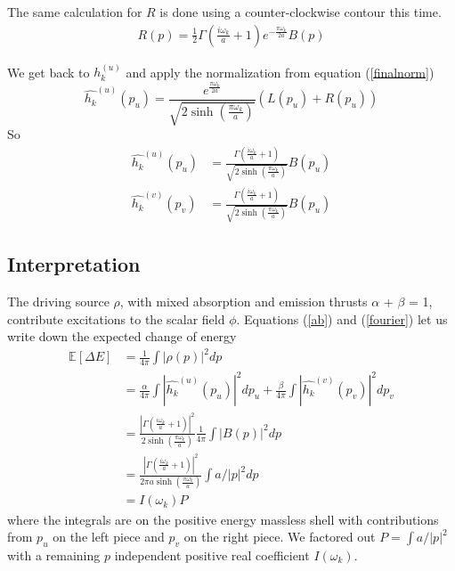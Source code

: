 \documentclass[12pt,a4paper]{article}
\begin{document}
The same calculation for $R$ is done using a counter-clockwise contour this time.
\begin{equation}
\begin{split}
  R(p) = \frac{1}{2}\Gamma\left(\frac{i\omega_k}{a} + 1\right) e^{-\frac{\pi \omega_k}{2a}} B(p)
\end{split}
\end{equation}

We get back to $h_k^{(u)}$ and apply the normalization from equation (\ref{finalnorm})
\begin{equation}
\hat{h_k}^{(u)}(p_u) = \frac{e^{\frac{\pi \omega_k}{2a}}}{\sqrt{2 \sinh \left({\frac{\pi\omega_k}{a}}\right)}}  ( L(p_u) + R(p_u) )
\end{equation}
So
\begin{equation}
\label{fourier}
\begin{split}
\hat{h_k}^{(u)}(p_u) & = \frac{\Gamma\left(\frac{i\omega_k}{a} + 1\right)}{\sqrt{2 \sinh \left({\frac{\pi\omega_k}{a}}\right)}} B(p_u)\\
\hat{h_k}^{(v)}(p_v) &= \frac{\Gamma\left(\frac{i\omega_k}{a} + 1\right)}{\sqrt{2 \sinh \left({\frac{\pi\omega_k}{a}}\right)}} B(p_u)
\end{split}
\end{equation}
\subsection{Interpretation}
The driving source $\rho$, with mixed absorption and emission thrusts $\alpha$ + $\beta$ = 1, contribute excitations to the scalar field $\phi$. Equations (\ref{ab}) and (\ref{fourier}) let us write down the expected change of energy
\begin{equation}  
  \label{number}
  \begin{split}
    \mathbb{E}[\Delta E] &= \frac{1}{4\pi} \int{|\rho(p)|^2 dp} \\
    &= \frac{\alpha}{4\pi} \int{\left|\hat{h_k}^{(u)}(p_u)\right|^2 dp_u} + \frac{\beta}{4\pi}\int{\left|\hat{h_k}^{(v)}(p_v)\right|^2dp_v} \\
    &= \frac{\left|\Gamma\left(\frac{i\omega_k}{a} + 1\right)\right|^2}{2 \sinh \left({\frac{\pi\omega_k}{a}}\right)} \frac{1}{4\pi} \int{{\left|B(p)\right|^2} dp} \\
    &=  \frac{\left|\Gamma\left(\frac{i\omega_k}{a} + 1\right)\right|^2}{2 \pi a \sinh \left({\frac{\pi\omega_k}{a}}\right)} \int{a/|p|^2 dp}\\  
&=I(\omega_k) P
  \end{split}
\end{equation}
where the integrals are on the positive energy massless shell with contributions from $p_u$ on the left piece and $p_v$ on the right piece.  We factored out $P = \int{a/|p|^2}$ with a remaining $p$ independent positive real coefficient $I(\omega_k)$.
\end{document}
